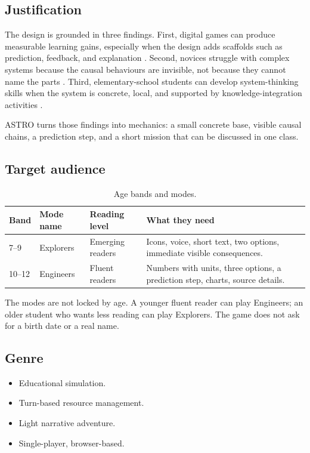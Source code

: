 \documentclass[11pt,a4paper]{article}
\begin{document}
\subsection{Justification}

The design is grounded in three findings. First, digital games can produce measurable learning gains, especially when the design adds scaffolds such as prediction, feedback, and explanation \cite{clark2016}. Second, novices struggle with complex systems because the causal behaviours are invisible, not because they cannot name the parts \cite{hmelo2007}. Third, elementary-school students can develop system-thinking skills when the system is concrete, local, and supported by knowledge-integration activities \cite{benzvi2010}.

ASTRO turns those findings into mechanics: a small concrete base, visible causal chains, a prediction step, and a short mission that can be discussed in one class.

\subsection{Target audience}

\begin{table}[H]
\centering
\small
\begin{tabular}{@{}p{1.6cm}p{2.6cm}p{3.4cm}p{6.6cm}@{}}
\toprule
\textbf{Band} & \textbf{Mode name} & \textbf{Reading level} & \textbf{What they need}\\
\midrule
7--9 & Explorers & Emerging readers & Icons, voice, short text, two options, immediate visible consequences.\\
10--12 & Engineers & Fluent readers & Numbers with units, three options, a prediction step, charts, source details.\\
\bottomrule
\end{tabular}
\caption{Age bands and modes.}
\label{tab:audience}
\end{table}

The modes are not locked by age. A younger fluent reader can play Engineers; an older student who wants less reading can play Explorers. The game does not ask for a birth date or a real name.

\subsection{Genre}

\begin{itemize}
  \item Educational simulation.
  \item Turn-based resource management.
  \item Light narrative adventure.
  \item Single-player, browser-based.
\end{itemize}
\end{document}

